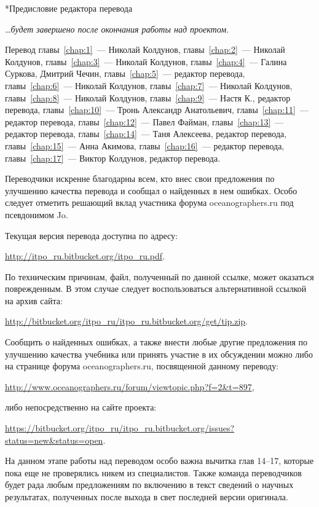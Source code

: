 
\begin{chapter}*{Предисловие редактора перевода}

\textit{\dots{}будет завершено после окончания работы над проектом.}

\bigskip 

Перевод главы~\ref{chap:1}~--- Николай Колдунов, 
главы~\ref{chap:2}~--- Николай Колдунов,
главы~\ref{chap:3}~--- Николай Колдунов, 
главы~\ref{chap:4}~--- Галина Суркова, Дмитрий Чечин, 
главы~\ref{chap:5}~--- редактор перевода, 
главы~\ref{chap:6}~--- Николай Колдунов, 
главы~\ref{chap:7}~--- Николай Колдунов,
главы~\ref{chap:8}~--- Николай Колдунов,
главы~\ref{chap:9}~--- Настя К., редактор перевода,
главы~\ref{chap:10}~--- Тронь Александр Анатольевич,
главы~\ref{chap:11}~--- редактор перевода,
главы~\ref{chap:12}~--- Павел Файман,
главы~\ref{chap:13}~--- редактор перевода,
главы~\ref{chap:14}~--- Таня Алексеева, редактор перевода,
главы~\ref{chap:15}~--- Анна Акимова,
главы~\ref{chap:16}~--- редактор перевода,
главы~\ref{chap:17}~--- Виктор Колдунов, редактор перевода.

Переводчики искренне благодарны всем, кто внес свои предложения по
улучшению качества перевода и сообщал о найденных в нем ошибках. Особо
следует отметить решающий вклад участника форума oceanographers.ru под
псевдонимом Jo.

Текущая версия перевода доступна по адресу:
\begin{center}
\href{http://itpo_ru.bitbucket.org/itpo_ru.pdf}%
{\url{http://itpo_ru.bitbucket.org/itpo_ru.pdf}}. 
\end{center}
По техническим причинам,
файл, полученный по данной ссылке, может оказаться поврежденным. В
этом случае следует воспользоваться альтернативной ссылкой на архив
сайта: 
\begin{center}
\href{http://bitbucket.org/itpo_ru/itpo_ru.bitbucket.org/get/tip.zip}%
{\url{http://bitbucket.org/itpo_ru/itpo_ru.bitbucket.org/get/tip.zip}}.
\end{center}

Сообщить о найденных ошибках, а также внести любые другие предложения
по улучшению качества учебника или принять участие в их обсуждении
можно либо на странице форума oceanographers.ru, посвященной данному
переводу:
\begin{center}
 \href{http://www.oceanographers.ru/forum/viewtopic.php?f=2&t=897}%
{\url{http://www.oceanographers.ru/forum/viewtopic.php?f=2&t=897}},
\end{center}
либо непосредственно на сайте проекта:
\begin{center}
\href{https://bitbucket.org/itpo_ru/itpo_ru.bitbucket.org/issues?status=new&status=open}%
{\url{https://bitbucket.org/itpo_ru/itpo_ru.bitbucket.org/issues?status=new&status=open}}.
\end{center}

На данном этапе работы над переводом особо важна вычитка глав 14--17,
которые пока еще не проверялись никем из специалистов. Также команда
переводчиков будет рада любым предложениям по включению в текст
сведений о научных результатах, полученных после выхода в свет
последней версии оригинала.
\end{chapter}
